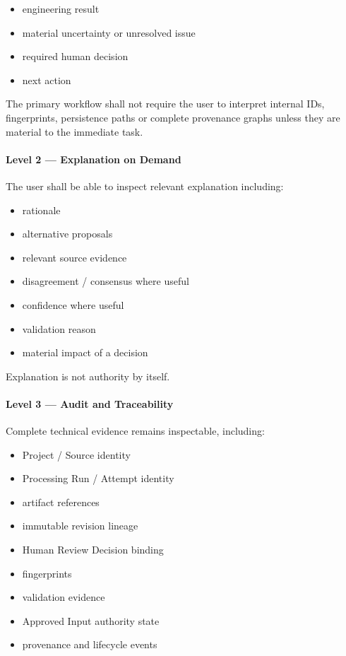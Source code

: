 \begin{itemize}
\tightlist
\item
  engineering result
\item
  material uncertainty or unresolved issue
\item
  required human decision
\item
  next action
\end{itemize}

The primary workflow shall not require the user to interpret internal IDs, fingerprints, persistence paths or complete provenance graphs unless they are material to the immediate task.

\hypertarget{level-2--explanation-on-demand}{%
\paragraph{Level 2 --- Explanation on Demand}\label{level-2--explanation-on-demand}}

The user shall be able to inspect relevant explanation including:

\begin{itemize}
\tightlist
\item
  rationale
\item
  alternative proposals
\item
  relevant source evidence
\item
  disagreement / consensus where useful
\item
  confidence where useful
\item
  validation reason
\item
  material impact of a decision
\end{itemize}

Explanation is not authority by itself.

\hypertarget{level-3--audit-and-traceability}{%
\paragraph{Level 3 --- Audit and Traceability}\label{level-3--audit-and-traceability}}

Complete technical evidence remains inspectable, including:

\begin{itemize}
\tightlist
\item
  Project / Source identity
\item
  Processing Run / Attempt identity
\item
  artifact references
\item
  immutable revision lineage
\item
  Human Review Decision binding
\item
  fingerprints
\item
  validation evidence
\item
  Approved Input authority state
\item
  provenance and lifecycle events
\end{itemize}

